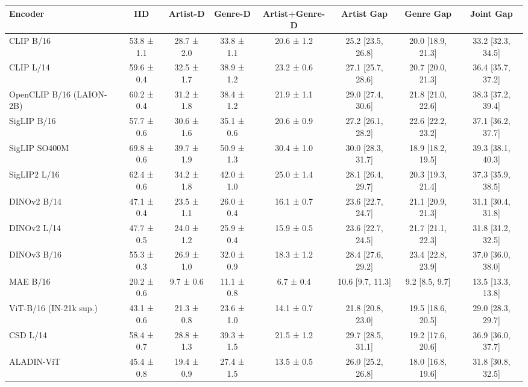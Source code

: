 \begin{tabular}{lccccccc}
\toprule
Encoder & IID & Artist-D & Genre-D & Artist+Genre-D & Artist Gap & Genre Gap & Joint Gap \\
\midrule
CLIP B/16 & 53.8 ± 1.1 & 28.7 ± 2.0 & 33.8 ± 1.1 & 20.6 ± 1.2 & 25.2 [23.5, 26.8] & 20.0 [18.9, 21.3] & 33.2 [32.3, 34.5] \\
CLIP L/14 & 59.6 ± 0.4 & 32.5 ± 1.7 & 38.9 ± 1.2 & 23.2 ± 0.6 & 27.1 [25.7, 28.6] & 20.7 [20.0, 21.3] & 36.4 [35.7, 37.2] \\
OpenCLIP B/16 (LAION-2B) & 60.2 ± 0.4 & 31.2 ± 1.8 & 38.4 ± 1.2 & 21.9 ± 1.1 & 29.0 [27.4, 30.6] & 21.8 [21.0, 22.6] & 38.3 [37.2, 39.4] \\
SigLIP B/16 & 57.7 ± 0.6 & 30.6 ± 1.6 & 35.1 ± 0.6 & 20.6 ± 0.9 & 27.2 [26.1, 28.2] & 22.6 [22.2, 23.2] & 37.1 [36.2, 37.7] \\
SigLIP SO400M & 69.8 ± 0.6 & 39.7 ± 1.9 & 50.9 ± 1.3 & 30.4 ± 1.0 & 30.0 [28.3, 31.7] & 18.9 [18.2, 19.5] & 39.3 [38.1, 40.3] \\
SigLIP2 L/16 & 62.4 ± 0.6 & 34.2 ± 1.8 & 42.0 ± 1.0 & 25.0 ± 1.4 & 28.1 [26.4, 29.7] & 20.3 [19.3, 21.4] & 37.3 [35.9, 38.5] \\
DINOv2 B/14 & 47.1 ± 0.4 & 23.5 ± 1.1 & 26.0 ± 0.4 & 16.1 ± 0.7 & 23.6 [22.7, 24.7] & 21.1 [20.9, 21.3] & 31.1 [30.4, 31.8] \\
DINOv2 L/14 & 47.7 ± 0.5 & 24.0 ± 1.2 & 25.9 ± 0.4 & 15.9 ± 0.5 & 23.6 [22.7, 24.5] & 21.7 [21.1, 22.3] & 31.8 [31.2, 32.5] \\
DINOv3 B/16 & 55.3 ± 0.3 & 26.9 ± 1.0 & 32.0 ± 0.9 & 18.3 ± 1.2 & 28.4 [27.6, 29.2] & 23.4 [22.8, 23.9] & 37.0 [36.0, 38.0] \\
MAE B/16 & 20.2 ± 0.6 & 9.7 ± 0.6 & 11.1 ± 0.8 & 6.7 ± 0.4 & 10.6 [9.7, 11.3] & 9.2 [8.5, 9.7] & 13.5 [13.3, 13.8] \\
ViT-B/16 (IN-21k sup.) & 43.1 ± 0.6 & 21.3 ± 0.8 & 23.6 ± 1.0 & 14.1 ± 0.7 & 21.8 [20.8, 23.0] & 19.5 [18.6, 20.5] & 29.0 [28.3, 29.7] \\
CSD L/14 & 58.4 ± 0.7 & 28.8 ± 1.3 & 39.3 ± 1.5 & 21.5 ± 1.2 & 29.7 [28.5, 31.1] & 19.2 [17.6, 20.6] & 36.9 [36.0, 37.7] \\
ALADIN-ViT & 45.4 ± 0.8 & 19.4 ± 0.9 & 27.4 ± 1.5 & 13.5 ± 0.5 & 26.0 [25.2, 26.8] & 18.0 [16.8, 19.6] & 31.8 [30.8, 32.5] \\
\bottomrule
\end{tabular}
